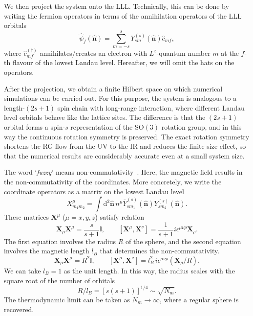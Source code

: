 \documentclass{timesjhep}
\begin{document}
We then project the system onto the LLL. Technically, this can be done by writing the fermion operators in terms of the annihilation operators of the LLL orbitals
\begin{equation}
    \hat{\psi}_f(\hat{\mathbf{n}})=\sum_{m=-s}^s Y^{(s)}_{sm}(\hat{\mathbf{n}})\hat{c}_{mf},
\end{equation}
where $\hat{c}^{(\dagger)}_{mf}$ annihilates/creates an electron with $L^z$-quantum number $m$ at the $f$-th flavour of the lowest Landau level. Hereafter, we will omit the hats on the operators.

After the projection, we obtain a finite Hilbert space on which numerical simulations can be carried out. For this purpose, the system is analogous to a length-$(2s+1)$ spin chain with long-range interaction, where different Landau level orbitals behave like the lattice sites. The difference is that the $(2s+1)$ orbital forms a spin-$s$ representation of the $\mathrm{SO}(3)$ rotation group, and in this way the continuous rotation symmetry is preserved. The exact rotation symmetry shortens the RG flow from the UV to the IR and reduces the finite-size effect, so that the numerical results are considerably accurate even at a small system size.

The word `\emph{fuzzy}' means non-commutativity~\cite{Madore1991Fuzzy}. Here, the magnetic field results in the non-commutativity of the coordinates. More concretely, we write the coordinate operators as a matrix on the lowest Landau level
\begin{equation}
    X^\mu_{m_1m_2}=\int\mathrm{d}^2\hat{\mathbf{n}}\,n^\mu \bar{Y}_{sm_1}^{(s)}(\hat{\mathbf{n}})Y_{sm_2}^{(s)}(\hat{\mathbf{n}}).
\end{equation}
These matrices $\mathbf{X}^\mu$ ($\mu=x,y,z$) satisfy relation~\cite{Hasebe2010LLL,Zhou2023}
\begin{equation}
    \mathbf{X}_\mu\mathbf{X}^\mu=\frac{s}{s+1}\mathbb{I},\qquad [\mathbf{X}^\mu,\mathbf{X}^\nu]=\frac{1}{s+1}i\epsilon^{\mu\nu\rho}\mathbf{X}_\rho.
\end{equation}
The first equation involves the radius $R$ of the sphere, and the second equation involves the magnetic length $l_B$ that determines the non-commutativity.
\begin{equation*}
    \mathbf{X}_\mu\mathbf{X}^\mu=R^2\mathbb{I},\qquad [\mathbf{X}^\mu,\mathbf{X}^\nu]=l_B^2\,i\epsilon^{\mu\nu\rho}(\mathbf{X}_\rho/R).
\end{equation*}
We can take $l_B=1$ as the unit length. In this way, the radius scales with the square root of the number of orbitals
\begin{equation}
    R/l_B=[s(s+1)]^{1/4}\sim\sqrt{N_m}.
\end{equation}
The thermodynamic limit can be taken as $N_m\to\infty$, where a regular sphere is recovered.
\end{document}
